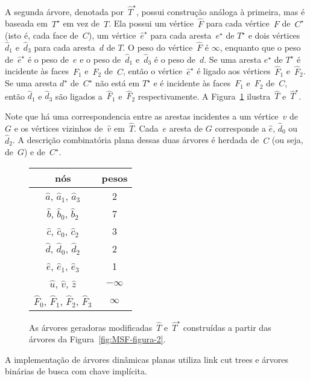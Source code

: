 A segunda árvore, denotada por~$\hat T^\star$, possui construção análoga à primeira, mas é baseada em~$T^\star$ em vez de~$T$.
Ela possui um vértice~$\hat F$ para cada vértice~$F$ de~$C^\star$ (isto é, cada face de~$C$), um vértice~$\hat e^\star$ para cada aresta~$e^\star$ de $T^\star$ e dois vértices $\hat d_1$ e~$\hat d_3$ para cada aresta~$d$ de $T$.
O peso do vértice~$\hat F$ é $\infty$, enquanto que o peso de~$\hat e^\star$ é o peso de~$e$ e o peso de~$\hat d_1$ e~$\hat d_3$ é o peso de~$d$.
Se uma aresta $e^\star$ de $T^\star$ é incidente às faces~$F_1$ e~$F_2$ de~$C$, então o vértice~$\hat e^\star$ é ligado aos vértices~$\hat F_1$ e~$\hat F_2$.
Se uma aresta $d^\star$ de~$C^\star$ não está em $T^\star$ e é incidente às faces~$F_1$ e~$F_2$ de~$C$, então $\hat d_1$ e $\hat d_3$ são ligados a~$\hat F_1$ e~$\hat F_2$ respectivamente.
A Figura~\ref{fig:MSF-figura-3} ilustra~$\hat T$ e~$\hat T^\star$.

Note que há uma correspondencia entre as arestas incidentes a um vértice~$v$ de~$G$ e os vértices vizinhos de~$\hat v$ em~$\hat T$.
Cada~$e$ aresta de $G$ corresponde a $\hat e$, $\hat d_0$ ou~$\hat d_2$. 
A descrição combinatória plana dessas duas árvores é herdada de~$C$ (ou seja, de~$G$) e de~$C^\star$.

\begin{figure}[htb]
\centering

\begin{tabular}{| c  c |} 
 \hline
 nós & pesos\\
 \hline
 $\hat a$, $\hat a_1$, $\hat a_3$ & 2 \\ 
 \hline
 $\hat b$, $\hat b_0$, $\hat b_2$ & 7 \\
 \hline
 $\hat c$, $\hat c_0$, $\hat c_2$ & 3 \\
 \hline
 $\hat d$, $\hat d_0$, $\hat d_2$ & 2 \\
 \hline
 $\hat e$, $\hat e_1$, $\hat e_3$ & 1 \\
 \hline
 $\hat u$, $\hat v$, $\hat z$ & $-\infty$ \\
 \hline
 $\hat F_0$, $\hat F_1$, $\hat F_2$, $\hat F_3$ & $\infty$ \\
 \hline
\end{tabular}
\caption{As árvores geradoras modificadas~$\hat T$ e~$\hat T^\star$ construídas a partir das árvores da Figura~\ref{fig:MSF-figura-2}.}
\label{fig:MSF-figura-3}
\end{figure}

A implementação de árvores dinâmicas planas utiliza link cut trees e árvores binárias de busca com chave implícita.

